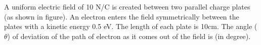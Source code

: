 \item A uniform electric field of 10 N/C is created between two parallel charge plates (as shown in figure). An electron enters the field symmetrically between the plates with a kinetic energy 0.5 eV. The length of each plate is 10cm. The angle (\(\theta\)) of deviation of the path of electron as it comes out of the field is \underline{\hspace{2.5cm}} (in degree).
    \begin{center}
    \end{center}